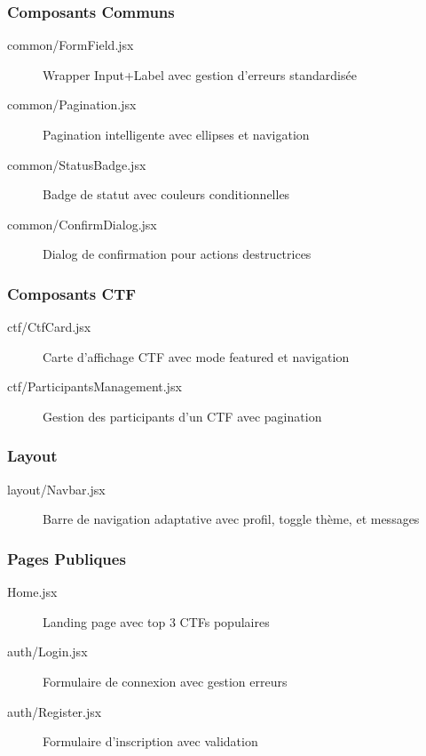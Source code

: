 \subsubsection{Composants Communs}

\begin{description}
    \item[common/FormField.jsx] Wrapper Input+Label avec gestion d'erreurs standardisée
    \item[common/Pagination.jsx] Pagination intelligente avec ellipses et navigation
    \item[common/StatusBadge.jsx] Badge de statut avec couleurs conditionnelles
    \item[common/ConfirmDialog.jsx] Dialog de confirmation pour actions destructrices
\end{description}

\subsubsection{Composants CTF}

\begin{description}
    \item[ctf/CtfCard.jsx] Carte d'affichage CTF avec mode featured et navigation
    \item[ctf/ParticipantsManagement.jsx] Gestion des participants d'un CTF avec pagination
\end{description}

\subsubsection{Layout}

\begin{description}
    \item[layout/Navbar.jsx] Barre de navigation adaptative avec profil, toggle thème, et messages
\end{description}

\subsubsection{Pages Publiques}

\begin{description}
    \item[Home.jsx] Landing page avec top 3 CTFs populaires
    \item[auth/Login.jsx] Formulaire de connexion avec gestion erreurs
    \item[auth/Register.jsx] Formulaire d'inscription avec validation
\end{description}

